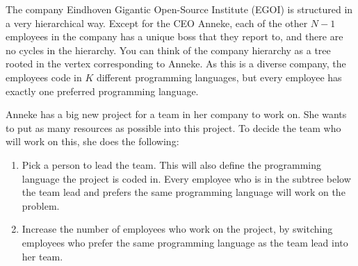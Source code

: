 The company Eindhoven Gigantic Open-Source Institute (EGOI) is structured in a very hierarchical way. Except for the CEO Anneke, each of the other $N-1$ employees in the company has a unique boss that they report to, and there are no cycles in the hierarchy. You can think of the company hierarchy as a tree rooted in the vertex corresponding to Anneke.
As this is a diverse company, the employees code in $K$ different programming languages, but every employee has exactly one preferred programming language.

Anneke has a big new project for a team in her company to work on. She wants to put as many resources as possible into this project. To decide the team who will work on this, she does the following:
\begin{enumerate}
\item Pick a person to lead the team. This will also define the programming language the project is coded in. Every employee who is in the subtree below the team lead and prefers the same programming language will work on the problem.
\item Increase the number of employees who work on the project, by switching employees who prefer the same programming language as the team lead into her team.


\end{enumerate}
